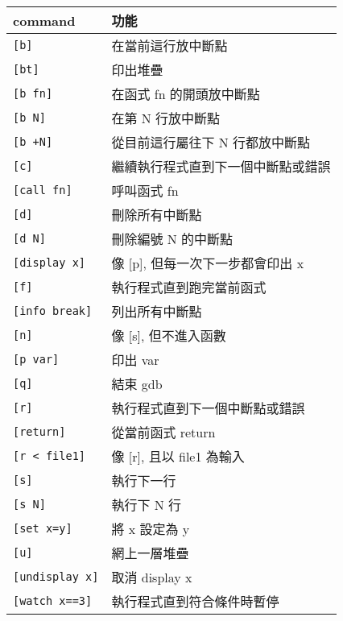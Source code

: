 \begin{tabular}[c]{|l|l|}
    \hline
    command             & 功能 \\
    \hline
    \verb|[b]|          & 在當前這行放中斷點 \\
    \verb|[bt]|         & 印出堆疊 \\
    \verb|[b fn]|       & 在函式 fn 的開頭放中斷點 \\
    \verb|[b N]|        & 在第 N 行放中斷點 \\
    \verb|[b +N]|       & 從目前這行屬往下 N 行都放中斷點 \\
    \verb|[c]|          & 繼續執行程式直到下一個中斷點或錯誤 \\
    \verb|[call fn]|    & 呼叫函式 fn \\
    \verb|[d]|          & 刪除所有中斷點 \\
    \verb|[d N]|        & 刪除編號 N 的中斷點 \\
    \verb|[display x]|  & 像 [p], 但每一次下一步都會印出 x \\
    \verb|[f]|          & 執行程式直到跑完當前函式 \\
    \verb|[info break]| & 列出所有中斷點 \\
    \verb|[n]|          & 像 [s], 但不進入函數 \\
    \verb|[p var]|      & 印出 var \\
    \verb|[q]|          & 結束 gdb \\
    \verb|[r]|          & 執行程式直到下一個中斷點或錯誤 \\
    \verb|[return]|     & 從當前函式 return \\
    \verb|[r < file1]|  & 像 [r], 且以 file1 為輸入 \\
    \verb|[s]|          & 執行下一行 \\
    \verb|[s N]|        & 執行下 N 行 \\
    \verb|[set x=y]|    & 將 x 設定為 y \\
    \verb|[u]|          & 網上一層堆疊 \\
    \verb|[undisplay x]| & 取消 display x \\
    \verb|[watch x==3]| & 執行程式直到符合條件時暫停 \\
    \hline
\end{tabular}